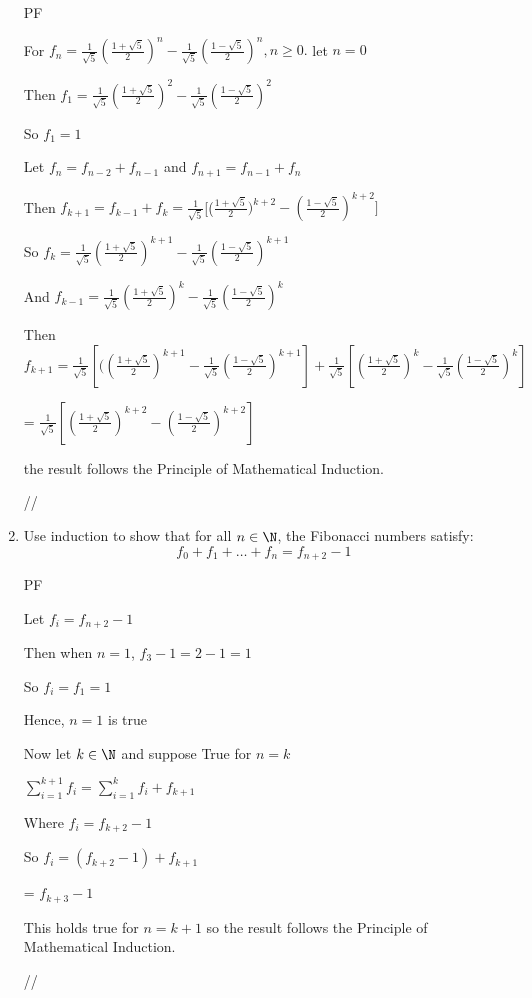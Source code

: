 \documentclass[12pt]{article}
\begin{document}
\begin{enumerate}
{PF

For $f_n = \frac{1}{\sqrt{5}} \left( \frac{1 + \sqrt{5}}{2} \right)^n - \frac{1}{\sqrt{5}} \left( \frac{1 - \sqrt{5}}{2} \right)^n, n \geq 0.$ let $n = 0$

Then $f_1 = \frac{1}{\sqrt{5}}(\frac{1+\sqrt{5}}{2})^{2} - \frac{1}{\sqrt{5}}(\frac{1-\sqrt{5}}{2})^{2}$

So $f_1 = 1$

Let $f_n = f_{n-2} + f_{n-1}$
and $f_{n+1} = f_{n-1} + f_n$

Then $f_{k+1} = f_{k-1} + f_{k} = \frac{1}{\sqrt{5}}$[($\frac{1+\sqrt{5}}{2})^{k+2}-(\frac{1-\sqrt{5}}{2})^{k+2}] $

So $f_{k}  = \frac{1}{\sqrt{5}}(\frac{1+\sqrt{5}}{2})^{k+1} - \frac{1}{\sqrt{5}}(\frac{1-\sqrt{5}}{2})^{k+1} $

And  $f_{k-1}  = \frac{1}{\sqrt{5}}(\frac{1+\sqrt{5}}{2})^{k} - \frac{1}{\sqrt{5}}(\frac{1-\sqrt{5}}{2})^{k} $

Then $f_{k+1} = \frac{1}{\sqrt{5}}[((\frac{1+\sqrt{5}}{2})^{k+1} - \frac{1}{\sqrt{5}}(\frac{1-\sqrt{5}}{2})^{k+1}] + \frac{1}{\sqrt{5}}[(\frac{1+\sqrt{5}}{2})^{k} - \frac{1}{\sqrt{5}}(\frac{1-\sqrt{5}}{2})^{k}] $

= $\frac{1}{\sqrt{5}}[(\frac{1+\sqrt{5}}{2})^{k+2}-(\frac{1-\sqrt{5}}{2})^{k+2}]$

the result  follows the Principle of Mathematical Induction.

//
}

\item Use induction to show that for all $n \in \N$, the Fibonacci numbers satisfy:
$$f_0 + f_1 + \hdots + f_{n} = f_{n+2} - 1$$ 
{PF

Let $f_i = f_{n+2} - 1$

Then when $n =1$, $f_3 -1 = 2 - 1 = 1$

So $f_i = f_1 = 1$ 

Hence, $n = 1$ is true

Now let $k \in \N$ and suppose True for $n = k$


$\sum\limits_{i=1}^{k+1} f_i = \sum\limits_{i=1}^{k} f_i + f_{k+1}$


Where $f_i = f_{k+2} - 1 $

So $f_i = ( f_{k+2} - 1 )+ f_{k+1} $

= $ f_{k+3} - 1$

This holds true for $n = k +1$ so the result  follows the Principle of Mathematical Induction.

//
}









\end{enumerate}
\end{document}
